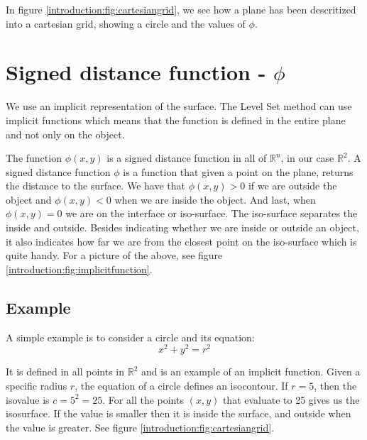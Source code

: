 In figure \vref{introduction:fig:cartesiangrid}, we see how a plane has been descritized into a cartesian grid, showing a circle and the values of $\phi$.

\section*{Signed distance function -  $\phi$}

We use an implicit representation of the surface. The Level Set method can use implicit functions which means that the function is defined in the entire plane and not only on the object.

The function $\phi(x,y)$ is a signed distance function in all of
$\mathbb{R}^{n}$, in our case $\mathbb{R}^{2}$. A signed distance
function $\phi$ is a function that given a point on the plane, returns
the distance to the surface. We have that $\phi(x,y) > 0$ if we are
outside the object and $\phi(x,y) < 0$ when we are inside the object.
And last, when $\phi(x,y) = 0$ we are on the interface or iso-surface. 
The iso-surface separates the inside and outside.  Besides indicating
whether we are inside or outside an object, it also indicates how far
we are from the closest point on the iso-surface which is quite
handy. For a picture of the above, see figure
\vref{introduction:fig:implicitfunction}.



\subsection*{Example}

A simple example is to consider a circle and its equation:
\begin{equation*}
  x^{2} + y^{2} = r^{2}
\end{equation*}

It is defined in all points in $\mathbb{R}^{2}$ and is an example of an implicit function. Given a specific radius $r$, the equation of a circle defines an isocontour. If $r = 5$, then the isovalue is $c = 5^{2} = 25$. For all the points $(x,y)$ that evaluate to 25 gives us the isosurface. If the value is smaller then it is inside the surface, and outside when the value is greater. See figure \vref{introduction:fig:cartesiangrid}.


